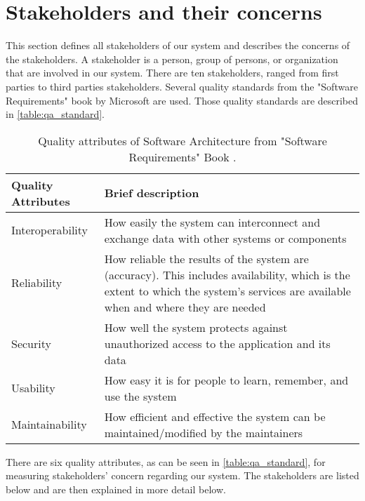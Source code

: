 \section{Stakeholders and their concerns}


This section defines all stakeholders of our system and describes the concerns of the stakeholders. A stakeholder is a person, group of persons, or organization that are involved in our system. There are ten stakeholders, ranged from first parties to third parties stakeholders. Several quality standards from the "Software Requirements" book by Microsoft \cite{wiegers2013software} are used. Those quality standards are described in \autoref{table:qa_standard}.

\begin{table}[!htbp] \centering
	\caption{Quality attributes of Software Architecture from "Software Requirements" Book \cite{wiegers2013software}.}
	\label{table:qa_standard}
	\begin{tabular}{L{} L{}}
		\toprule
		\textbf{Quality Attributes} & \textbf{Brief description}                                                                                        \\ \midrule
		Interoperability            & How easily the system can interconnect and exchange data with other systems or components                         \\
		Reliability                 & How reliable the results of the system are (accuracy). This includes availability, which is the extent to which the system's services are available when and where they are needed \\
		Security                    & How well the system protects against unauthorized access to the application and its data                          \\
		Usability                   & How easy it is for people to learn, remember, and use the system                                                  \\
		Maintainability             & How efficient and effective the system can be maintained/modified by the maintainers \\
		\bottomrule
	\end{tabular}
\end{table}

There are six quality attributes, as can be seen in \autoref{table:qa_standard}, for measuring stakeholders' concern regarding our system.  The stakeholders are listed below and are then explained in more detail below.

